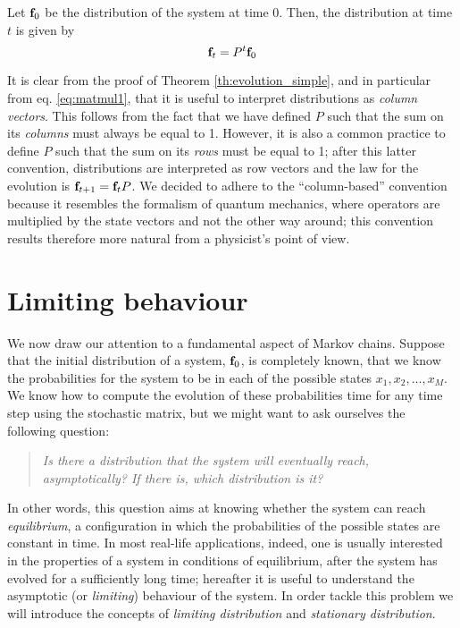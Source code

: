 \begin{corollary} \label{th:evolution_complete}
    Let $\mathbf{f}_0$ be the distribution of the system at time 0. Then, the distribution at time $t$ is given by
    \begin{equation}
        \mathbf{f}_t = P^t \mathbf{f}_0
    \end{equation}
\end{corollary}

\begin{remark}
    It is clear from the proof of Theorem \ref{th:evolution_simple}, and in particular from eq. \ref{eq:matmul1}, that it is useful to interpret distributions as \emph{column vectors}. This follows from the fact that we have defined $P$ such that the sum on its \emph{columns} must always be equal to 1. However, it is also a common practice to define $P$ such that the sum on its \emph{rows} must be equal to 1; after this latter convention, distributions are interpreted as row vectors and the law for the evolution is $\mathbf{f}_{t+1} = \mathbf{f}_t P$. We decided to adhere to the \enquote{column-based} convention because it resembles the formalism of quantum mechanics, where operators are multiplied by the state vectors and not the other way around; this convention results therefore more natural from a physicist's point of view.
\end{remark}

\section{Limiting behaviour}
We now draw our attention to a fundamental aspect of Markov chains. Suppose that the initial distribution of a system, $\mathbf{f}_0$, is completely known, \ie that we know the probabilities for the system to be in each of the possible states $x_1, x_2, \dots, x_M$. We know how to compute the evolution of these probabilities time for any time step using the stochastic matrix, but we might want to ask ourselves the following question:
\begin{quote}
    \emph{Is there a distribution that the system will eventually reach, asymptotically? If there is, which distribution is it?}
\end{quote}
In other words, this question aims at knowing whether the system can reach \emph{equilibrium}, \ie a configuration in which the probabilities of the possible states are constant in time.
In most real-life applications, indeed, one is usually interested in the properties of a system in conditions of equilibrium, after the system has evolved for a sufficiently long time; hereafter it is useful to understand the asymptotic (or \emph{limiting}) behaviour of the system. In order tackle this problem we will introduce the concepts of \emph{limiting distribution} and \emph{stationary distribution}.

